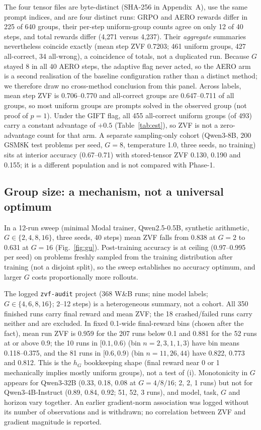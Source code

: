\documentclass[conference]{IEEEtran}
\begin{document}
The four tensor files are byte-distinct (SHA-256 in Appendix~A), use the
same prompt indices, and are four distinct runs: GRPO and AERO rewards
differ in 225 of 640 groups, their per-step uniform-group counts agree on
only 12 of 40 steps, and total rewards differ (4,271 versus 4,237). Their
\emph{aggregate} summaries nevertheless coincide exactly (mean step ZVF
0.7203; 461 uniform groups, 427 all-correct, 34 all-wrong), a coincidence
of totals, not a duplicated run. Because $G$ stayed 8 in all 40 AERO steps,
the adaptive flag never acted, so the AERO arm is a second realisation of
the baseline configuration rather than a distinct method; we therefore
draw no cross-method conclusion from this panel. Across labels, mean step
ZVF is 0.706--0.770 and all-correct groups are 0.647--0.711 of all groups,
so most uniform groups are prompts solved in the observed group (not proof
of $p=1$). Under the GIFT flag, all 455 all-correct uniform groups (of 493) carry a
constant advantage of $+0.5$ (Table~\ref{tab:est}), so ZVF is not a
zero-advantage count for that arm. A separate sampling-only cohort
(Qwen3-8B, 200 GSM8K test problems per seed, $G=8$, temperature 1.0, three
seeds, no training) sits at interior accuracy (0.67--0.71) with
stored-tensor ZVF 0.130, 0.190 and 0.155; it is a different population and
is not compared with Phase-1.

\subsection{Group size: a mechanism, not a universal optimum}
In a 12-run sweep (minimal Modal trainer, Qwen2.5-0.5B, synthetic
arithmetic, $G\in\{2,4,8,16\}$, three seeds, 40 steps) mean ZVF falls from
0.838 at $G=2$ to 0.631 at $G=16$ (Fig.~\ref{fig:gu}). Post-training
accuracy is at ceiling (0.97--0.995 per seed) on problems freshly sampled
from the training distribution after training (not a disjoint split), so
the sweep establishes no accuracy optimum, and larger $G$ costs
proportionally more rollouts.

The logged \texttt{zvf-audit} project (368 W\&B runs; nine model labels;
$G\in\{4,6,8,16\}$; 2--12 steps) is a heterogeneous summary, not a cohort.
All 350 finished runs carry final reward and mean ZVF; the 18
crashed/failed runs carry neither and are excluded. In fixed 0.1-wide
final-reward bins (chosen after the fact), mean run ZVF is 0.959 for the
207 runs below 0.1 and 0.881 for the 52 runs at or above 0.9; the 10 runs
in $[0.1,0.6)$ (bin $n=2,3,1,1,3$) have bin means 0.118--0.375, and the 81
runs in $[0.6,0.9)$ (bin $n=11,26,44$) have 0.822, 0.773 and 0.812. This
is the $h_G$ bookkeeping shape (final reward near 0 or 1 mechanically
implies mostly uniform groups), not a test of (i). Monotonicity in $G$
appears for Qwen3-32B (0.33, 0.18, 0.08 at $G=4/8/16$; 2, 2, 1 runs) but
not for Qwen3-4B-Instruct (0.89, 0.84, 0.92; 51, 52, 3 runs), and model,
task, $G$ and horizon vary together. An earlier gradient-norm association
was logged without its number of observations and is withdrawn; no
correlation between ZVF and gradient magnitude is reported.
\end{document}
